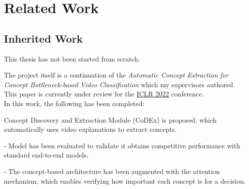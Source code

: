 % 
% 
% 
% 
% 
% 
% 






\chapter{Related Work}

\section{Inherited Work}
\label{inherited-work}

This thesis has not been started from scratch.

The project itself is a continuation of the \emph{Automatic Concept Extraction for Concept Bottleneck-based Video Classification} \cite{RefWorks:RefID:16-2021automatic} which my supervisors authored.
This paper is currently under review for the \href{https://iclr.cc/}{ICLR 2022} conference. \\

In this work, the following has been completed:

 Concept Discovery and Extraction Module (CoDEx) is proposed, which automatically uses video explanations to extract concepts.
 
 - Model has been evaluated to validate it obtains competitive performance with standard end-to-end models.
 
 - The concept-based architecture has been augmented with the attention mechanism, which enables verifying how important each concept is for a decision.
 
